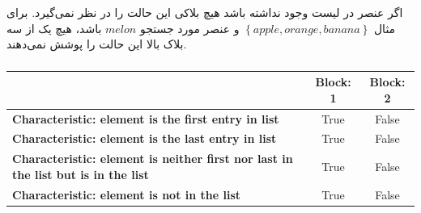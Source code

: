 \documentclass{article}
\begin{document}
\subsubsection{}
اگر عنصر در لیست وجود نداشته باشد هیچ بلاکی این حالت را در نظر نمی‌گیرد. برای مثال $\left\{ apple, orange, banana \right\}$ و عنصر مورد جستجو $melon$ باشد، هیچ یک از سه بلاک بالا این حالت را پوشش نمی‌دهند.

\subsubsection{}
\begin{latin}
\begin{table}[H]
\begin{tabular}{|l|c|c|}
\hline
                                                                                          & \textbf{Block: 1} & \textbf{Block: 2} \\ \hline
\textbf{Characteristic: element is the first entry in list}                                 & True        & False       \\ \hline
\textbf{Characteristic: element is the last entry in list}                                  & True        & False       \\ \hline
\textbf{Characteristic: element is neither first nor last in the list but is in the list} & True        & False       \\ \hline
\textbf{Characteristic: element is not in the list}                                       & True        & False       \\ \hline
\end{tabular}
\end{table}
\end{latin}
\end{document}
